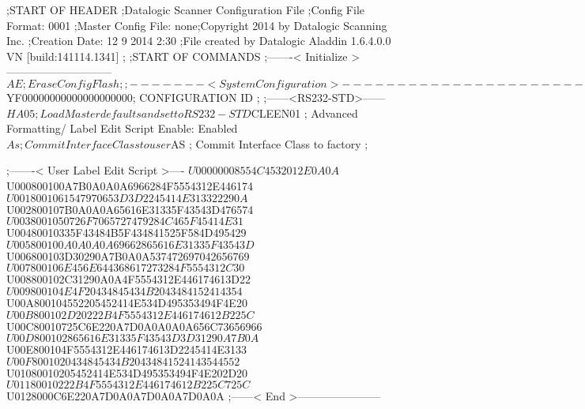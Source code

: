 ;START OF HEADER
;Datalogic Scanner Configuration File
;Config File Format: 0001
;Master Config File: none;Copyright 2014 by Datalogic Scanning Inc.
;Creation Date: 12 9 2014 2:30
;File created by Datalogic Aladdin 1.6.4.0.0 VN [build:141114.1341]
;
;START OF COMMANDS
;-------< Initialize >-----------------------------
$AE                 ; Erase Config Flash
;
;-------< System Configuration >-------------------------------
$YF00000000000000000000; CONFIGURATION ID
;
;------<RS232-STD>------
$HA05               ; Load Master defaults and set to RS232-STD
$CLEEN01            ; Advanced Formatting/ Label Edit Script Enable: Enabled
$As                 ; Commit Interface Class to user
$AS                 ; Commit Interface Class to factory
;

;-------< User Label Edit Script >----
$U00000008554C4532012E0A0A
$U000800100A7B0A0A0A6966284F5554312E446174
$U0018001061547970653D3D2245414E313322290A
$U002800107B0A0A0A65616E31335F43543D476574
$U0038001050726F7065727479284C465F45414E31
$U00480010335F43484B5F434841525F584D495429
$U005800100A0A0A0A69662865616E31335F43543D
$U006800103D30290A7B0A0A537472697042656769
$U007800106E456E644368617273284F5554312C30
$U008800102C31290A0A4F5554312E446174613D22
$U009800104E4F20434845434B2043484152414354
$U00A800104552205452414E534D495353494F4E20
$U00B800102D20222B4F5554312E446174612B225C
$U00C80010725C6E220A7D0A0A0A0A656C73656966
$U00D800102865616E31335F43543D3D31290A7B0A
$U00E800104F5554312E446174613D2245414E3133
$U00F8001020434845434B20434841524143544552
$U01080010205452414E534D495353494F4E202D20
$U01180010222B4F5554312E446174612B225C725C
$U0128000C6E220A7D0A0A7D0A0A7D0A0A
;------< End >-----------------------
